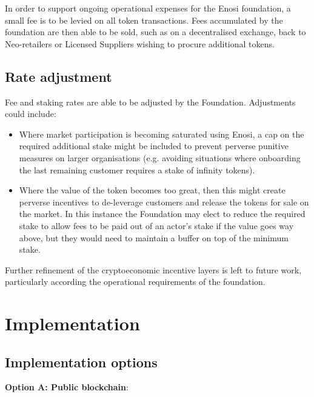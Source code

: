 \documentclass{article}
\theoremstyle{definition}
\theoremstyle{plain} %
\begin{document}
In order to support ongoing operational expenses for the Enosi foundation, a small fee is to be levied on all token transactions. Fees accumulated by the foundation are then able to be sold, such as on a decentralised exchange, back to Neo-retailers or Licensed Suppliers wishing to procure additional tokens. \\

\subsection{Rate adjustment}

Fee and staking rates are able to be adjusted by the Foundation. Adjustments could include:

\begin{itemize}

\item{Where market participation is becoming saturated using Enosi, a cap on the required additional stake might be included to prevent perverse punitive measures on larger organisations (e.g. avoiding situations where onboarding the last remaining customer requires a stake of infinity tokens).}

\item{Where the value of the token becomes too great, then this might create perverse incentives to de-leverage customers and release the tokens for sale on the market. In this instance the Foundation may elect to reduce the required stake to allow fees to be paid out of an actor’s stake if the value goes way above, but they would need to maintain a buffer on top of the minimum stake.}

\end{itemize}

\noindent Further refinement of the cryptoeconomic incentive layers is left to future work, particularly according the operational requirements of the foundation.



\pagebreak
\section{Implementation}

\subsection{Implementation options}

\textbf{Option A: Public blockchain}: \\
\end{document}

